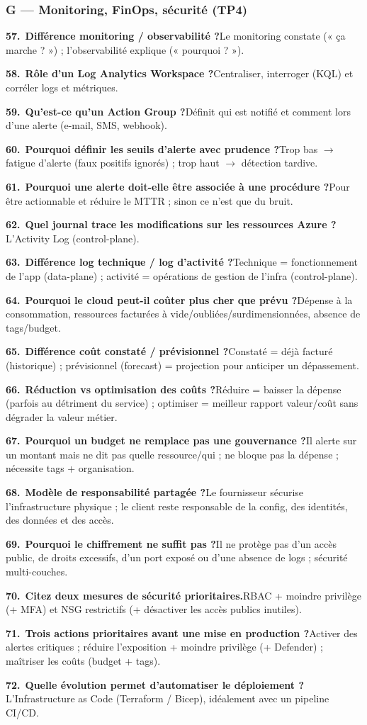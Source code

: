 \documentclass[11pt,a4paper]{article}
\newcommand{\arr}{\ensuremath{\rightarrow}}
\newcommand{\qa}[3]{\par\addvspace{1.5pt}%
  \textbf{\color{azuredark}#1.}~\textbf{#2}\quad#3\par}
\begin{document}
\subsubsection{G — Monitoring, FinOps, sécurité (TP4)}
\qa{57}{Différence monitoring / observabilité ?}{Le monitoring constate (« ça marche ? ») ; l'observabilité explique (« pourquoi ? »).}
\qa{58}{Rôle d'un Log Analytics Workspace ?}{Centraliser, interroger (KQL) et corréler logs et métriques.}
\qa{59}{Qu'est-ce qu'un Action Group ?}{Définit qui est notifié et comment lors d'une alerte (e-mail, SMS, webhook).}
\qa{60}{Pourquoi définir les seuils d'alerte avec prudence ?}{Trop bas \arr{} fatigue d'alerte (faux positifs ignorés) ; trop haut \arr{} détection tardive.}
\qa{61}{Pourquoi une alerte doit-elle être associée à une procédure ?}{Pour être actionnable et réduire le MTTR ; sinon ce n'est que du bruit.}
\qa{62}{Quel journal trace les modifications sur les ressources Azure ?}{L'Activity Log (control-plane).}
\qa{63}{Différence log technique / log d'activité ?}{Technique = fonctionnement de l'app (data-plane) ; activité = opérations de gestion de l'infra (control-plane).}
\qa{64}{Pourquoi le cloud peut-il coûter plus cher que prévu ?}{Dépense à la consommation, ressources facturées à vide/oubliées/surdimensionnées, absence de tags/budget.}
\qa{65}{Différence coût constaté / prévisionnel ?}{Constaté = déjà facturé (historique) ; prévisionnel (forecast) = projection pour anticiper un dépassement.}
\qa{66}{Réduction vs optimisation des coûts ?}{Réduire = baisser la dépense (parfois au détriment du service) ; optimiser = meilleur rapport valeur/coût sans dégrader la valeur métier.}
\qa{67}{Pourquoi un budget ne remplace pas une gouvernance ?}{Il alerte sur un montant mais ne dit pas quelle ressource/qui ; ne bloque pas la dépense ; nécessite tags + organisation.}
\qa{68}{Modèle de responsabilité partagée ?}{Le fournisseur sécurise l'infrastructure physique ; le client reste responsable de la config, des identités, des données et des accès.}
\qa{69}{Pourquoi le chiffrement ne suffit pas ?}{Il ne protège pas d'un accès public, de droits excessifs, d'un port exposé ou d'une absence de logs ; sécurité multi-couches.}
\qa{70}{Citez deux mesures de sécurité prioritaires.}{RBAC + moindre privilège (+ MFA) et NSG restrictifs (+ désactiver les accès publics inutiles).}
\qa{71}{Trois actions prioritaires avant une mise en production ?}{Activer des alertes critiques ; réduire l'exposition + moindre privilège (+ Defender) ; maîtriser les coûts (budget + tags).}
\qa{72}{Quelle évolution permet d'automatiser le déploiement ?}{L'Infrastructure as Code (Terraform / Bicep), idéalement avec un pipeline CI/CD.}
\end{document}
